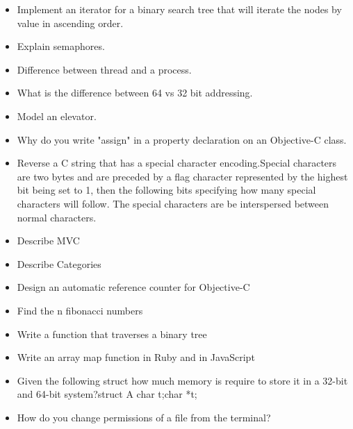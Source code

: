 \documentclass{article}
\begin{document}
\begin{itemize}
	\item Implement an iterator for a binary search tree that will iterate the nodes by value in ascending order.
	\item Explain semaphores.
	\item Difference between thread and a process.
	\item What is the difference between 64 vs 32 bit addressing.
	\item Model an elevator.
	\item Why do you write "assign" in a property declaration on an Objective-C class.
	\item Reverse a C string that has a special character encoding.Special characters are two bytes and are preceded by a flag character represented by the highest bit being set to 1, then the following bits specifying how many special characters will follow. The special characters are be interspersed between normal characters.
	\item Describe MVC
	\item Describe Categories
	\item Design an automatic reference counter for Objective-C
	\item Find the n fibonacci numbers
	\item Write a function that traverses a binary tree
	\item Write an array map function in Ruby and in JavaScript
	\item Given the following struct how much memory is require to store it in a 32-bit and 64-bit system?struct A { char t;char *t;}
	\item How do you change permissions of a file from the terminal?  
	  	
\end{itemize}
\end{document}
